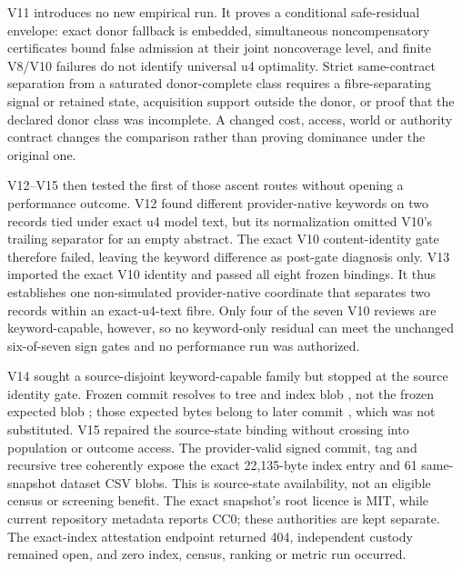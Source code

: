 V11 introduces no new empirical run. It proves a conditional safe-residual
envelope: exact donor fallback is embedded, simultaneous noncompensatory
certificates bound false admission at their joint noncoverage level, and finite
V8/V10 failures do not identify universal u4 optimality. Strict same-contract
separation from a saturated donor-complete class requires a fibre-separating
signal or retained state, acquisition support outside the donor, or proof that
the declared donor class was incomplete. A changed cost, access, world or
authority contract changes the comparison rather than proving dominance under
the original one.

V12--V15 then tested the first of those ascent routes without opening a
performance outcome.  V12 found different provider-native keywords on two
records tied under exact u4 model text, but its normalization omitted V10's
trailing separator for an empty abstract.  The exact V10 content-identity gate
therefore failed, leaving the keyword difference as post-gate diagnosis only.
V13 imported the exact V10 identity and passed all eight frozen bindings.  It
thus establishes one non-simulated provider-native coordinate that separates
two records within an exact-u4-text fibre.  Only four of the seven V10 reviews
are keyword-capable, however, so no keyword-only residual can meet the unchanged
six-of-seven sign gates and no performance run was authorized.

V14 sought a source-disjoint keyword-capable family but stopped at the source
identity gate.  Frozen commit
 resolves to tree
 and index blob
, not the frozen expected
blob ; those expected bytes
belong to later commit ,
which was not substituted.  V15 repaired the source-state binding without
crossing into population or outcome access.  The provider-valid signed commit,
tag and recursive tree coherently expose the exact 22,135-byte index entry and
61 same-snapshot dataset CSV blobs.  This is source-state availability, not an
eligible census or screening benefit.  The exact snapshot's root licence is
MIT, while current repository metadata reports CC0; these authorities are kept
separate.  The exact-index attestation endpoint returned 404, independent
custody remained open, and zero index, census, ranking or metric run occurred.


